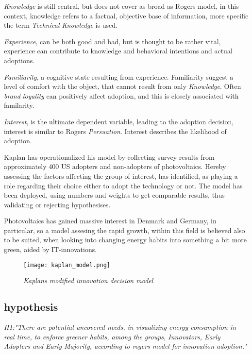 \documentclass[journal]{IEEEtran}
\begin{document}
\textit{Knowledge} is still central, but does not cover as broad as Rogers model, in this context, knowledge refers to a factual, objective base of information, more specific the term \textit{Technical Knowledge} is used.\newline

\textit{Experience}, can be both good and bad, but is thought to be rather vital, experience can contribute to knowledge and behavioral intentions and actual adoptions.\newline

\textit{Familiarity}, a cognitive state resulting from experience. Familiarity suggest a level of comfort with the object, that cannot result from only \textit{Knowledge}. Often \textit{brand loyality} can positively affect adoption, and this is closely associated with familarity.\newline

\textit{Interest}, is the ultimate dependent variable, leading to the adoption decision, interest is similar to Rogers \textit{Persuation}. Interest describes the likelihood of adoption. \newline


Kaplan has operationalized his model by collecting survey results from approximately 400 US adopters and non-adopters of photovoltaics. Hereby assessing the factors affecting the group of interest, has identified, as playing a role regarding their choice either to adopt the technology or not. The model has been deployed, using numbers and weights to get comparable results, thus validating or rejecting hypothesises.

Photovoltaics has gained massive interest in Denmark and Germany, in particular, so a model assesing the rapid growth, within this field is believed also to be suited, when looking into changing energy habits into something a bit more green, aided by IT-innovations.

\begin{figure}
\texttt{[image: kaplan\_model.png]}
\caption{\textit{Kaplans modified innovation decision model}}			
\label{fig:kaplan_model} %
\end{figure}


\subsection{hypothesis}
\textit{H1:"There are potential uncovered needs, in visualizing energy consumption in real time, to enforce greener habits, among the groups, Innovators, Early Adopters and Early Majority, according to rogers model for innovation adoption."}\newline
\end{document}

